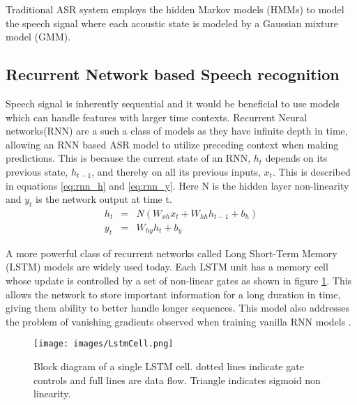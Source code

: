 \documentclass{article}
\begin{document}
Traditional ASR system employs the hidden Markov models (HMMs) to model the speech signal where each acoustic state is modeled by a Gaussian mixture model (GMM).

\subsection{Recurrent Network based Speech recognition}
Speech signal is inherently sequential and it would be beneficial to use models which can handle features with larger time contexts. Recurrent Neural networks(RNN) are a such a class of models as they have infinite depth in time, allowing an RNN based ASR model to utilize preceding context when making predictions. This is because the current state of an RNN, $h_t$ depends on its previous state, $h_{t-1}$, and thereby on all its previous inputs, $x_t$. This is described in equations \ref{eq:rnn_h} and \ref{eq:rnn_y}. Here N is the hidden layer non-linearity and $y_t$ is the network output at time t.
\begin{eqnarray}
	\label{eq:rnn_h} h_t &=& N(W_{xh}x_t+W_{hh}h_{t-1}+b_h)\\
	\label{eq:rnn_y} y_t &=& W_{hy}h_t + b_y
\end{eqnarray} 

A more powerful class of recurrent networks called Long Short-Term Memory (LSTM) models \cite{Hochreiter:1997:LSM:1246443.1246450} are widely used today. Each LSTM unit has a memory cell whose update is controlled by a set of non-linear gates as shown in figure \ref{fig:lstmcell}. This allows the network to store important information for a long duration in time, giving them ability to better handle longer sequences. This model also addresses the problem of vanishing gradients observed when training vanilla RNN models \cite{Bengio93Vanishing}\cite{pascanu2012difficulty}.

\begin{figure}[t]
	\begin{center}
		\texttt{[image: images/LstmCell.png]}
	\end{center}
	\caption{Block diagram of a single LSTM cell. dotted lines indicate
		gate controls and full lines are data flow. Triangle indicates
		sigmoid non linearity.}
	\label{fig:lstmcell}
\end{figure}
\end{document}
